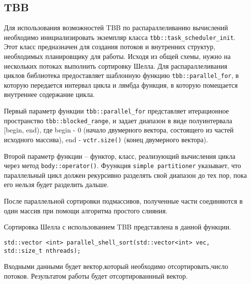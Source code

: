 \documentclass{report}
\begin{document}
\subsection*{TBB}
Для использования возможностей TBB по распараллеливанию вычислений необходимо инициализировать экземпляр класса \verb|tbb::task_scheduler_init|. Этот класс предназначен для создания потоков и внутренних структур, необходимых планировщику для работы. Исходя из общей схемы, нужно на нескольких потоках выполнить сортировку Шелла. Для распараллеливания циклов библиотека предоставляет шаблонную функцию \verb|tbb::parallel_for|, в которую передается интервал цикла и лямбда функция, в которую помещается внутреннее содержание цикла.
\par Первый параметр функции  \verb|tbb::parallel_for| представляет итерационное пространство \verb|tbb::blocked_range|, и задает диапазон в виде полуинтервала [begin, end), где begin - 0 (начало двумерного вектора, состоящего из частей исходного массива), end - \verb|vctr.size()| (конец двумерного вектора).
\par Второй параметр функции – функтор, класс, реализующий вычисления цикла через метод \verb|body::operator()|. Фуункция
\verb|simple partitioner| указывает, что параллельный цикл должен рекурсивно разделять свой диапазон до тех пор, пока его нельзя будет разделить дальше. 
\par После параллельной сортировки подмассивов, полученные части соединяются в один массив при помощи алгоритма простого слияния.
\par Сортировка Шелла с использованием TBB представлена в данной функции.
\begin{lstlisting}
std::vector <int> parallel_shell_sort(std::vector<int> vec, std::size_t nthreads);
\end{lstlisting}
Входными данными будет вектор,который необходимо отсортировать,число потоков. Результатом работы будет отсортированнный вектор.
\end{document}
